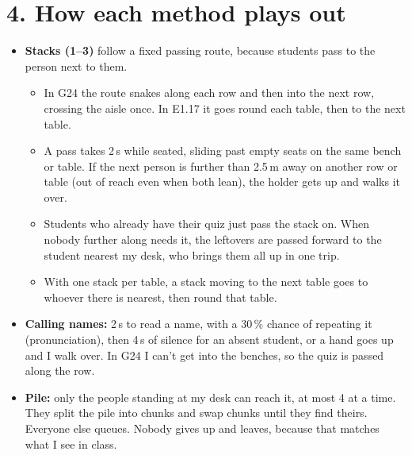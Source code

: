 \documentclass[10.5pt,a4paper]{article}
\begin{document}
\section*{4. How each method plays out}
\begin{itemize}
\item \textbf{Stacks (1--3)} follow a fixed passing route, because students pass to the person next to them.
  \begin{itemize}
  \item In G24 the route snakes along each row and then into the next row, crossing the aisle once. In E1.17 it goes round each table, then to the next table.
  \item A pass takes 2\,s while seated, sliding past empty seats on the same bench or table. If the next person is further than 2.5\,m away on another row or table (out of reach even when both lean), the holder gets up and walks it over.
  \item Students who already have their quiz just pass the stack on. When nobody further along needs it, the leftovers are passed forward to the student nearest my desk, who brings them all up in one trip.
  \item With one stack per table, a stack moving to the next table goes to whoever there is nearest, then round that table.
  \end{itemize}
\item \textbf{Calling names:} 2\,s to read a name, with a 30\,\% chance of repeating it (pronunciation), then 4\,s of silence for an absent student, or a hand goes up and I walk over. In G24 I can't get into the benches, so the quiz is passed along the row.
\item \textbf{Pile:} only the people standing at my desk can reach it, at most 4 at a time. They split the pile into chunks and swap chunks until they find theirs. Everyone else queues. Nobody gives up and leaves, because that matches what I see in class.
\end{itemize}
\end{document}
